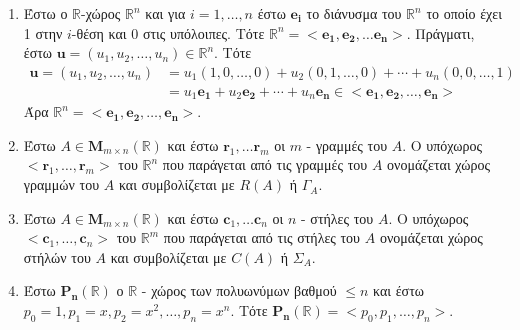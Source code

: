 \begin{examples}
\item {}
    \begin{enumerate}
        \item Έστω ο $ \mathbb{R} $-χώρος $ \mathbb{R}^{n} $ και για $ i= 1,\ldots,n $
            έστω $ \mathbf{e_{i}} $ το διάνυσμα του $ \mathbb{R}^{n} $ το οποίο έχει 
            1 στην $ i $-θέση και 0 στις υπόλοιπες. Τότε $ \mathbb{R}^{n} = 
            < \mathbf{e_{1}}, \mathbf{e_{2}}, \ldots \mathbf{e_{n}} >  $. 
            Πράγματι, έστω $ \mathbf{u} = (u_{1},u_{2},\ldots,u_{n}) \in 
            \mathbb{R}^{n} $. Τότε 
            \begin{align*}
                \mathbf{u} = (u_{1},u_{2},\ldots,u_{n}) 
                &=  u_{1} (1,0,\ldots,0) + u_{2} (0,1,\ldots,0) + 
                \cdots + u_{n} (0,0,\ldots,1) \\
                &= u_{1} \mathbf{e_{1}} + u_{2} \mathbf{e_{2}} + \cdots + u_{n} 
                \mathbf{e_{n}} \in < \mathbf{e_{1}}, \mathbf{e_{2}}, 
                \ldots, \mathbf{e_{n}} >  
            \end{align*} 
            Άρα $ \mathbb{R}^{n} = < \mathbf{e_{1}}, \mathbf{e_{2}}, 
            \ldots, \mathbf{e_{n}} >  $.
        \item Έστω $ A \in \textbf{M}_{m \times n}(\mathbb{R}) $ και έστω 
            $ \mathbf{r}_{1}, \ldots \mathbf{r}_{m} $ οι $m$ - γραμμές του $A$.  
            Ο υπόχωρος $ < \mathbf{r}_{1}, \ldots, \mathbf{r}_{m} >  $ του 
            $ \mathbb{R}^{n} $ που παράγεται από τις γραμμές του $A$ ονομάζεται 
            χώρος γραμμών του $A$ και συμβολίζεται με $ R(A) $ ή $ \Gamma_{A} $.
        \item Έστω $ A \in \textbf{M}_{m \times n}(\mathbb{R}) $ και έστω 
            $ \mathbf{c}_{1}, \ldots \mathbf{c}_{n} $ οι $n$ - στήλες του $A$.  
            Ο υπόχωρος $ < \mathbf{c}_{1}, \ldots, \mathbf{c}_{n} >  $ του 
            $ \mathbb{R}^{m} $ που παράγεται από τις στήλες του $A$ ονομάζεται 
            χώρος στήλών του $A$ και συμβολίζεται με $ C(A) $ ή $ \Sigma_{A} $.
        \item Έστω $ \mathbf{P_{n}}(\mathbb{R}) $ ο $ \mathbb{R} $ - χώρος των 
            πολυωνύμων βαθμού $ \leq n $ και έστω $ p_{0} = 1, p_{1}=x, p_{2}=x^{2}, 
            \ldots, p_{n}=x^{n} $. Τότε $ \mathbf{P_{n}}(\mathbb{R}) = 
            < p_{0}, p_{1}, \ldots, p_{n} > $.
    \end{enumerate}
\end{examples}

